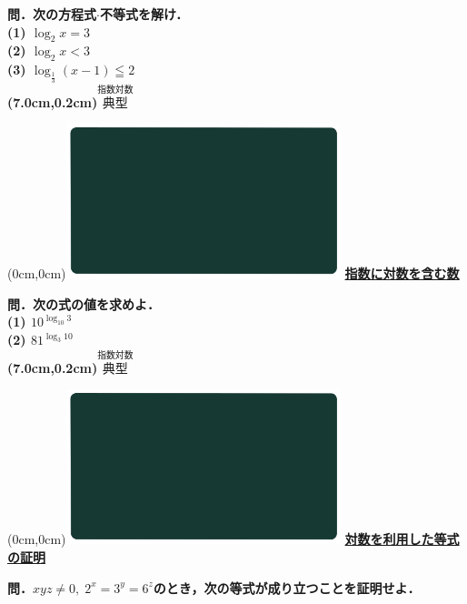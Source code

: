 \documentclass[10pt,
fleqn,
dvipdfmx,
uplatex
]{jsarticle}
\begin{document}
\large 
\bf\boldmath 問．次の方程式$\cdot$不等式を解け．\\
(1)  $\log _2x=3$\\
(2)  $\log _2x<3$\\
(3)  $\log _{\frac{1}{3}}\left(x-1\right)\leqq 2$\\

\at(7.0cm,0.2cm){\small\color{bradorange}$\overset{\text{指数対数}}{\text{典型}}$}


\newpage



\at(0cm,0cm){\includegraphics[width=8cm,bb=0 0 1920 1080]{./youtube/thumbnails/templates/smart_background/指数対数.jpeg}}
{\color{orange}\bf\boldmath\LARGE\underline{指数に対数を含む数}}\vspace{0.3zw}

\Large 
\bf\boldmath 問．次の式の値を求めよ．\\
(1)  ${10}^{\log _{{10}}3}$\\
(2)  ${81}^{\log _3{10}}$\\

\at(7.0cm,0.2cm){\small\color{bradorange}$\overset{\text{指数対数}}{\text{典型}}$}


\newpage



\at(0cm,0cm){\includegraphics[width=8cm,bb=0 0 1920 1080]{./youtube/thumbnails/templates/smart_background/指数対数.jpeg}}
{\color{orange}\bf\boldmath\Large\underline{対数を利用した等式の証明}}\vspace{0.3zw}

\Large 
\bf\boldmath 問．$xyz\neq 0,\;2^x=3^y=6^z$のとき，次の等式が成り立つことを証明せよ．
\end{document}
